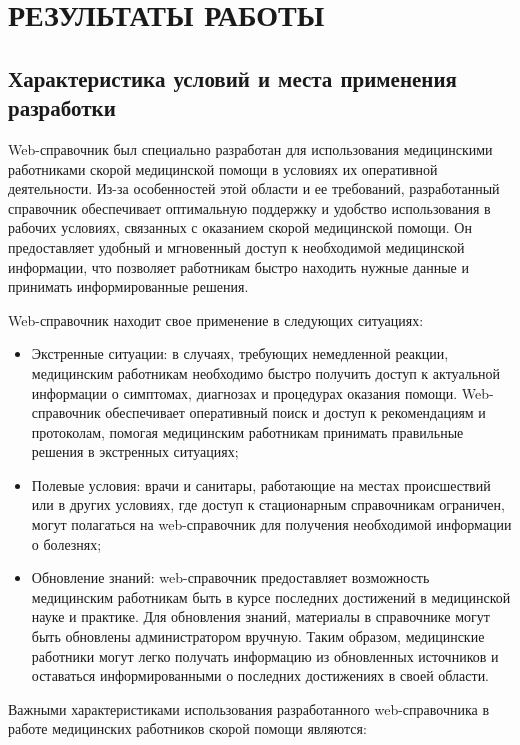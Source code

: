 \section{РЕЗУЛЬТАТЫ РАБОТЫ}

\subsection{Характеристика условий и места применения разработки}

Web-справочник был специально разработан для использования медицинскими работниками скорой медицинской помощи в условиях их оперативной деятельности. Из-за особенностей этой области и ее требований, разработанный справочник обеспечивает оптимальную поддержку и удобство использования в рабочих условиях, связанных с оказанием скорой медицинской помощи. Он предоставляет удобный и мгновенный доступ к необходимой медицинской информации, что позволяет работникам быстро находить нужные данные и принимать информированные решения.

Web-справочник находит свое применение в следующих ситуациях:

\begin{itemize}
    \item Экстренные ситуации: в случаях, требующих немедленной реакции, медицинским работникам необходимо быстро получить доступ к актуальной информации о симптомах, диагнозах и процедурах оказания помощи. Web-справочник обеспечивает оперативный поиск и доступ к рекомендациям и протоколам, помогая медицинским работникам принимать правильные решения в экстренных ситуациях;
    \item Полевые условия: врачи и санитары, работающие на местах происшествий или в других условиях, где доступ к стационарным справочникам ограничен, могут полагаться на web-справочник для получения необходимой информации о болезнях;
    \item Обновление знаний: web-справочник предоставляет возможность медицинским работникам быть в курсе последних достижений в медицинской науке и практике. Для обновления знаний, материалы в справочнике могут быть обновлены администратором вручную. Таким образом, медицинские работники могут легко получать информацию из обновленных источников и оставаться информированными о последних достижениях в своей области.
\end{itemize}

Важными характеристиками использования разработанного web-справочника в работе медицинских работников скорой помощи являются:

